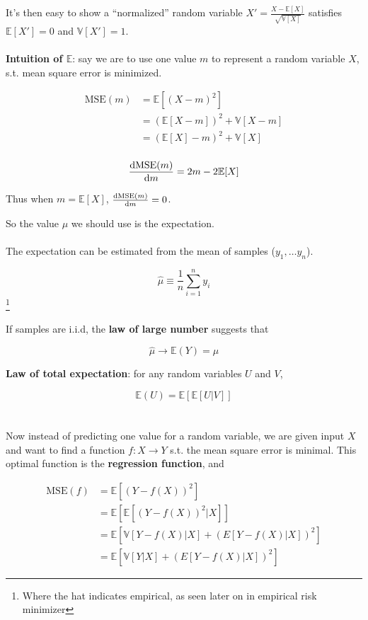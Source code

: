 \documentclass{article}
\begin{document}
It's then easy to show a ``normalized'' random variable $X' = \frac{X - \mathbb{E}[X]}{\sqrt{\mathbb{V}[X]}}$ satisfies $\mathbb{E}[X'] = 0$ and $\mathbb{V}[X'] = 1$.
\\
\\
\textbf{Intuition of $\mathbb{E}$}: say we are to use one value $m$ to represent a random variable $X$, s.t. mean square error is minimized.

\begin{align*}
\text{MSE}(m) &= \mathbb{E}[(X - m)^2] \\
              &= (\mathbb{E}[X - m])^2 + \mathbb{V}[X - m] \\
              &= (\mathbb{E}[X] - m)^2 + \mathbb{V}[X] \\
\end{align*}

$$
\derivative{\text{MSE}(m)}{m} = 2 m - 2 \mathbb{E}[X]
$$

Thus when $m = \mathbb{E}[X]$, $\derivative{\text{MSE}(m)}{m} = 0$.

So the value $\mu$ we should use is the expectation.
\\
\\
The expectation can be estimated from the mean of samples ($y_1, \dots y_n$).

$$
\hat{\mu} \equiv \frac{1}{n} \sum_{i = 1}^{n}{y_i}
$$\footnote{Where the hat indicates empirical, as seen later on in empirical risk minimizer}

If samples are i.i.d, the \textbf{law of large number} suggests that 

$$
\hat{\mu} \to \mathbb{E}(Y) = \mu
$$


\textbf{Law of total expectation}: for any random variables $U$ and $V$,

$$
\mathbb{E}(U) = \mathbb{E}[\mathbb{E}[U | V]]
$$
\\
\\
Now instead of predicting one value for a random variable, we are given input $X$ and want to find a function $f: X \to Y$ s.t. the mean square error is minimal.
This optimal function is the \textbf{regression function}, and

\begin{align*}
\text{MSE}(f) &= \mathbb{E}[(Y - f(X))^2]                                   \\
              &= \mathbb{E}[\mathbb{E}[(Y - f(X))^2 | X]]                   \\
              &= \mathbb{E}[\mathbb{V}[Y - f(X) | X] + (E[Y - f(X) | X])^2] \\
              &= \mathbb{E}[\mathbb{V}[Y | X] + (E[Y - f(X) | X])^2]
\end{align*}
\end{document}

